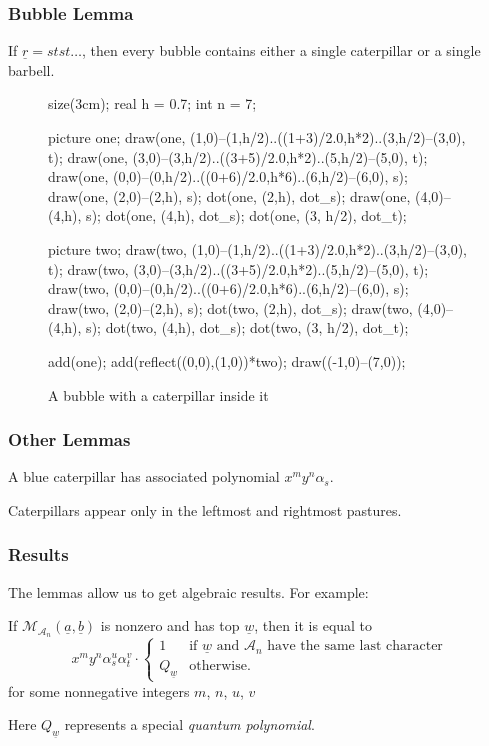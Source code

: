 \documentclass[pdf]{beamer}
\def\ul#1{\underline{#1}}
\def\AA{\mathcal A}
\def\MM{\mathcal M}
\begin{document}
\begin{frame}[fragile]
	\frametitle{Bubble Lemma}
	\begin{lemma}
		If $\ul r = stst\dots$, then
		every bubble contains either a single caterpillar or a single barbell.
	\end{lemma}
	\begin{figure}[ht]
		\centering
		\begin{asy}
		size(3cm);
		real h = 0.7;
		int n = 7;

		picture one;
		draw(one, (1,0)--(1,h/2)..((1+3)/2.0,h*2)..(3,h/2)--(3,0), t);
		draw(one, (3,0)--(3,h/2)..((3+5)/2.0,h*2)..(5,h/2)--(5,0), t);
		draw(one, (0,0)--(0,h/2)..((0+6)/2.0,h*6)..(6,h/2)--(6,0), s);
		draw(one, (2,0)--(2,h), s);
		dot(one, (2,h), dot_s);
		draw(one, (4,0)--(4,h), s);
		dot(one, (4,h), dot_s);
		dot(one, (3, h/2), dot_t);

		picture two;
		draw(two, (1,0)--(1,h/2)..((1+3)/2.0,h*2)..(3,h/2)--(3,0), t);
		draw(two, (3,0)--(3,h/2)..((3+5)/2.0,h*2)..(5,h/2)--(5,0), t);
		draw(two, (0,0)--(0,h/2)..((0+6)/2.0,h*6)..(6,h/2)--(6,0), s);
		draw(two, (2,0)--(2,h), s);
		dot(two, (2,h), dot_s);
		draw(two, (4,0)--(4,h), s);
		dot(two, (4,h), dot_s);
		dot(two, (3, h/2), dot_t);

		add(one); add(reflect((0,0),(1,0))*two);
		draw((-1,0)--(7,0));
		\end{asy}
		\caption{A bubble with a caterpillar inside it}
	\end{figure}
\end{frame}

\begin{frame}
	\frametitle{Other Lemmas}
	\begin{lemma}
		A blue caterpillar has associated polynomial $x^my^n\alpha_s$.
	\end{lemma}
	\pause
	\begin{lemma}
		Caterpillars appear only in the leftmost and rightmost pastures.
	\end{lemma}
\end{frame}
\begin{frame}
	\frametitle{Results}
	The lemmas allow us to get algebraic results.  For example:
	\begin{theorem}
		If $\MM_{\AA_n} (\ul a, \ul b)$ is nonzero and has top $\ul w$, then it is equal to
		\[
			x^{m}y^{n}\alpha_s^{u}\alpha_t^{v} \cdot
			\begin{cases}
				1 &\text{if $\ul w$ and $\AA_n$ have the same last character} \\
				Q_{\ul w} &\text{otherwise}.
			\end{cases}
		\]
		for some nonnegative integers $m$, $n$, $u$, $v$
		\label{thm:alt_struct}
	\end{theorem}
	Here $Q_{\ul w}$ represents a special \emph{quantum polynomial}.
\end{frame}
\end{document}
